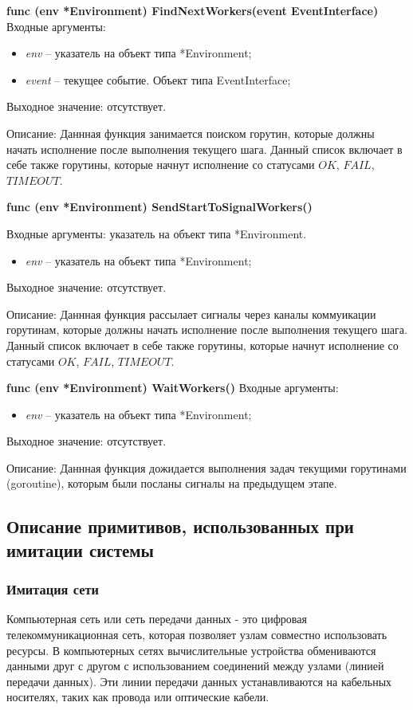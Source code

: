 \textbf{func (env *Environment) FindNextWorkers(event EventInterface)}
Входные аргументы:
\begin{itemize}
	\item \textit{env} -- указатель на объект типа *Environment;
	\item \textit{event} -- текущее событие. Объект типа EventInterface;
\end{itemize}

Выходное значение: отсутствует. 

Описание: Даннная функция занимается поиском горутин, которые должны начать исполнение после выполнения текущего шага. Данный список включает в себе также горутины, которые начнут исполнение со статусами $OK$, $FAIL$, $TIMEOUT$.

\textbf{func (env *Environment) SendStartToSignalWorkers()}

Входные аргументы: указатель на объект типа *Environment.
\begin{itemize}
	\item \textit{env} -- указатель на объект типа *Environment;
\end{itemize}
Выходное значение: отсутствует. 

Описание: Даннная функция рассылает сигналы через каналы коммуикации горутинам, которые должны начать исполнение после выполнения текущего шага. Данный список включает в себе также горутины, которые начнут исполнение со статусами $OK$, $FAIL$, $TIMEOUT$.

\textbf{func (env *Environment) WaitWorkers() }
Входные аргументы:
\begin{itemize}
	\item \textit{env} -- указатель на объект типа *Environment;
\end{itemize}

Выходное значение: отсутствует. 

Описание: Даннная функция дожидается выполнения задач текущими горутинами (goroutine), которым были посланы сигналы на предыдущем этапе.



\subsection{Описание примитивов, использованных при имитации системы}	

\subsubsection{Имитация сети}
\par 
Компьютерная сеть или сеть передачи данных - это цифровая телекоммуникационная сеть, которая позволяет узлам совместно использовать ресурсы. В компьютерных сетях вычислительные устройства обмениваются данными друг с другом с использованием соединений между узлами (линией передачи данных). Эти линии передачи данных устанавливаются на кабельных носителях, таких как провода или оптические кабели.

